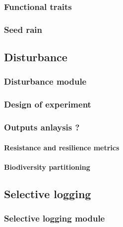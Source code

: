 \documentclass[]{article}
\let\oldparagraph\paragraph
\renewcommand{\paragraph}[1]{\oldparagraph{#1}\mbox{}}
\begin{document}
\subsubsection{Functional traits}\label{functional-traits}

\subsubsection{Seed rain}\label{seed-rain}

\subsection{Disturbance}\label{disturbance}

\subsubsection{Disturbance module}\label{disturbance-module}

\subsubsection{Design of experiment}\label{design-of-experiment}

\subsubsection{Outputs anlaysis ?}\label{outputs-anlaysis}

\paragraph{Resistance and resilience
metrics}\label{resistance-and-resilience-metrics}

\paragraph{Biodiversity partitioning}\label{biodiversity-partitioning}

\subsection{Selective logging}\label{selective-logging}

\subsubsection{Selective logging module}\label{selective-logging-module}
\end{document}
